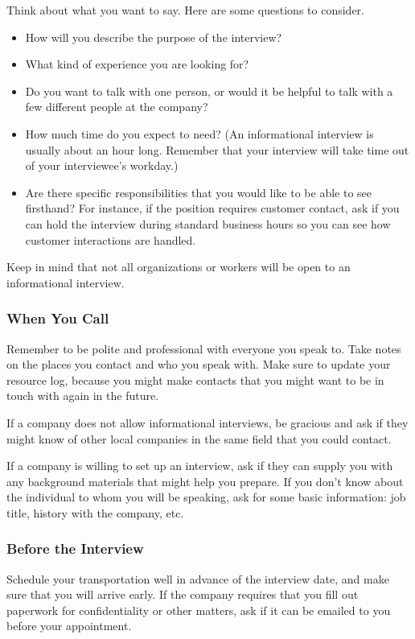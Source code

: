 Think about what you want to say. Here are some questions to consider.
\begin{itemize}[leftmargin=1.0cm]
	\item How will you describe the purpose of the interview?
	\item What kind of experience you are looking for?
	\item Do you want to talk with one person, or would it be helpful to talk with a few different people at the company?
	\item How much time do you expect to need? (An informational interview is usually about an hour long. Remember that your interview will take time out of your interviewee's workday.)
	\item Are there specific responsibilities that you would like to be able to see firsthand? For instance, if the position requires customer contact, ask if you can hold the interview during standard business hours so you can see how customer interactions are handled.
\end{itemize}
Keep in mind that not all organizations or workers will be open to an informational interview.

\subsubsection*{When You Call}

Remember to be polite and professional with everyone you speak to.
Take notes on the places you contact and who you speak with. Make sure to update your resource log, because you might make contacts that you might want to be in touch with again in the future.

If a company does not allow informational interviews, be gracious and ask if they might know of other local companies in the same field that you could contact.

If a company is willing to set up an interview, ask if they can supply you with any background materials that might help you prepare. If you don't know about the individual to whom you will be speaking, ask for some basic information: job title, history with the company, etc.

\subsubsection*{Before the Interview}

Schedule your transportation well in advance of the interview date, and make sure that you will arrive early. If the company requires that you fill out paperwork for confidentiality or other matters, ask if it can be emailed to you before your appointment.

